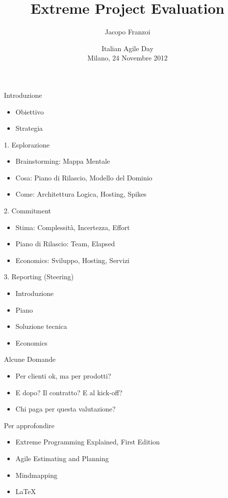 \documentclass[compress, red]{beamer}
\title{ Extreme Project Evaluation }
\author{
	Jacopo Franzoi
}
\institute{
	jacopo.franzoi@gmail.com
}
\date{
	Italian Agile Day \\
	Milano, 24 Novembre 2012
}
\begin{document}
\begin{frame}
	\titlepage
\end{frame}

\begin{frame}{Introduzione}	
	\begin{itemize}
		\item Obiettivo
		\item Strategia
	\end{itemize}
\end{frame}

\begin{frame}{1. Esplorazione}
	\begin{itemize}
		\item Brainstorming: Mappa Mentale
		\item Cosa: Piano di Rilascio, Modello del Dominio
		\item Come: Architettura Logica, Hosting, Spikes
	\end{itemize}
\end{frame}

\begin{frame}{2. Commitment}
	\begin{itemize}
		\item Stima: Complessità, Incertezza, Effort
		\item Piano di Rilascio: Team, Elapsed
		\item Economics: Sviluppo, Hosting, Servizi
	\end{itemize}
\end{frame}

\begin{frame}{3. Reporting (Steering)}
	\begin{itemize}
		\item Introduzione
		\item Piano
		\item Soluzione tecnica
		\item Economics
	\end{itemize}
\end{frame}

\begin{frame}{Alcune Domande}
	\begin{itemize}
		\item Per clienti ok, ma per prodotti?
		\item E dopo? Il contratto? E al kick-off?
		\item Chi paga per questa valutazione?
	\end{itemize}
\end{frame}

\begin{frame}{Per approfondire}
	\begin{itemize}
		\item Extreme Programming Explained, First Edition
		\item Agile Estimating and Planning
		\item Mindmapping
		\item LaTeX
	\end{itemize}
\end{frame}
\end{document}
